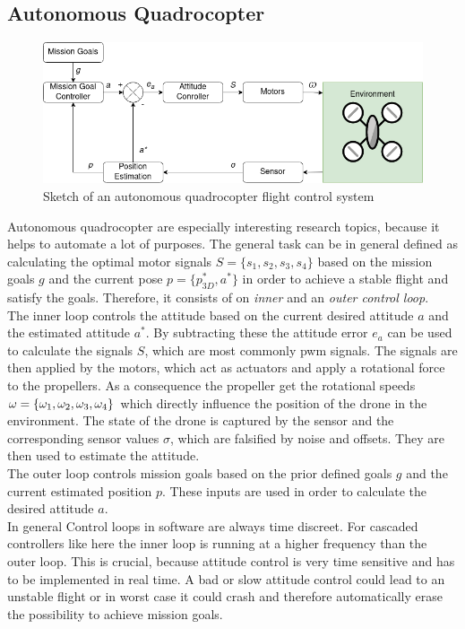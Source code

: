 \subsection{Autonomous Quadrocopter} \label{sec: autoquad}
\begin{figure}
	\centering
	\includegraphics[width=\linewidth]{figures/autoquad.png}
	\caption{Sketch of an autonomous quadrocopter flight control system}
	\label{fig:autoquad}
\end{figure}
Autonomous quadrocopter are especially interesting research topics, because it helps to automate a lot of purposes. 
The general task can be in general defined as calculating the optimal motor signals $S = \{s_1, s_2, s_3, s_4\}$ 
based on the mission goals $g$ and the current pose $p = \{ p_{3D}^*, a^*\}$ in order to achieve a stable flight and satisfy the goals. 
Therefore, it consists of on \emph{inner} and an \emph{outer control loop}.\\
\newline
The inner loop controls the attitude based on the current desired attitude $a$ and the estimated attitude $a^*$. 
By subtracting these the attitude error $e_a$ can be used to calculate the signals $S$, which are most commonly pwm signals. 
The signals are then applied by the motors, which act as actuators and apply a rotational force to the propellers. 
As a consequence the propeller get the rotational speeds ${\Huge \omega } = \{ \omega_1, \omega_2, \omega_3, \omega_4 \}$ 
which directly influence the position of the drone in the environment. 
The state of the drone is captured by the sensor and the corresponding sensor values $\sigma$, which are falsified by noise and offsets. 
They are then used to estimate the attitude. \\
The outer loop controls mission goals based on the prior defined goals $g$ and the current estimated position $p$. 
These inputs are used in order to calculate the desired attitude $a$.\\
\newline
In general Control loops in software are always time discreet. For cascaded controllers like here the inner loop
is running at a higher frequency than the outer loop. 
This is crucial, because attitude control is very time sensitive and has to be implemented in real time. 
A bad or slow attitude control could lead to an unstable flight or in worst case it could crash and therefore automatically erase the possibility to achieve mission goals.\\

